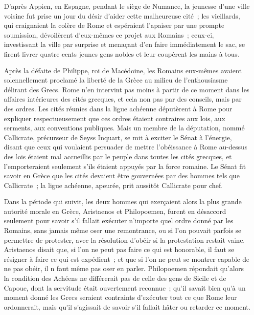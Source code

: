 \documentclass[french,twoside]{book} %
\begin{document}
D'après Appien, en Espagne, pendant le siège de Numance, la jeunesse d'une ville voisine fut prise un jour du désir d'aider cette malheureuse cité ; les vieillards, qui craignaient la colère de Rome et espéraient l'apaiser par une prompte soumission, dévoilèrent d'eux-mêmes ce projet aux Romains ; ceux-ci, investissant la ville par surprise et menaçant d'en faire immédiatement le sac, se firent livrer quatre cents jeunes gens nobles et leur coupèrent les mains à tous.\par
Après la défaite de Philippe, roi de Macédoine, les Romains eux-mêmes avaient solennellement proclamé la liberté de la Grèce au milieu de l'enthou­siasme délirant des Grecs. Rome n'en intervint pas moins à partir de ce moment dans les affaires intérieures des cités grecques, et cela non pas par des conseils, mais par des ordres. Les cités réunies dans la ligue achéenne dépu­tèrent à Rome pour expliquer respectueusement que ces ordres étaient contrai­res aux lois, aux serments, aux conventions publiques. Mais un membre de la députation, nommé Callicrate, précurseur de Seyss Inquart, se mit à exciter le Sénat à l'énergie, disant que ceux qui voulaient persuader de mettre l'obéis­sance à Rome au-dessus des lois étaient mal accueillis par le peuple dans toutes les cités grecques, et l'emporteraient seulement s'ils étaient appuyés par la force romaine. Le Sénat fit savoir en Grèce que les cités devaient être gouvernées par des hommes tels que Callicrate ; la ligue achéenne, apeurée, prit aussitôt Callicrate pour chef.\par
Dans la période qui suivit, les deux hommes qui exerçaient alors la plus grande autorité morale en Grèce, Aristaenos et Philopoemen, furent en désac­cord seulement pour savoir s'il fallait exécuter n'importe quel ordre donné par les Romains, sans jamais même oser une remontrance, ou si l'on pouvait parfois se permettre de protester, avec la résolution d'obéir si la protestation restait vaine. Aristaenos disait que, si l'on ne peut pas faire ce qui est honorable, il faut se résigner à faire ce qui est expédient ; et que si l'on ne peut se montrer capable de ne pas obéir, il n faut même pas oser en parler. Philopoemen répondait qu'alors la condition des Achéens ne différerait pas de celle des gens de Sicile et de Capoue, dont la servitude était ouvertement reconnue ; qu'il savait bien qu'à un moment donné les Grecs seraient con­traints d'exécuter tout ce que Rome leur ordonnerait, mais qu'il s'agissait de savoir s'il fallait hâter ou retarder ce moment.\par
\end{document}
